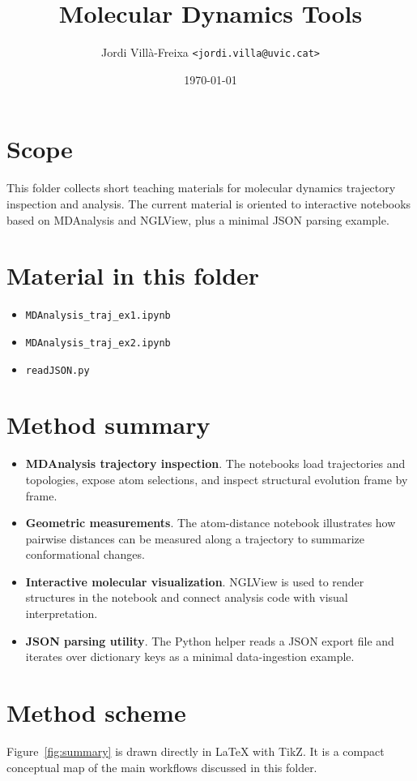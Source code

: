 \documentclass[11pt,a4paper]{article}
\title{Molecular Dynamics Tools}
\author{Jordi Vill\`a-Freixa \texttt{<jordi.villa@uvic.cat>}}
\date{\today}
\begin{document}
    \maketitle

    \section*{Scope}
    This folder collects short teaching materials for molecular dynamics trajectory inspection and analysis. The current material is oriented to interactive notebooks based on MDAnalysis and NGLView, plus a minimal JSON parsing example.

    \section*{Material in this folder}
    \begin{itemize}[leftmargin=*]
\item \texttt{MDAnalysis\_traj\_ex1.ipynb}
\item \texttt{MDAnalysis\_traj\_ex2.ipynb}
\item \texttt{readJSON.py}
    \end{itemize}

    \section*{Method summary}
    \begin{itemize}[leftmargin=*]
\item \textbf{MDAnalysis trajectory inspection}. The notebooks load trajectories and topologies, expose atom selections, and inspect structural evolution frame by frame.
\item \textbf{Geometric measurements}. The atom-distance notebook illustrates how pairwise distances can be measured along a trajectory to summarize conformational changes.
\item \textbf{Interactive molecular visualization}. NGLView is used to render structures in the notebook and connect analysis code with visual interpretation.
\item \textbf{JSON parsing utility}. The Python helper reads a JSON export file and iterates over dictionary keys as a minimal data-ingestion example.
    \end{itemize}

    \section*{Method scheme}
    Figure~\ref{fig:summary} is drawn directly in LaTeX with TikZ. It is a compact conceptual map of the main workflows discussed in this folder.
\end{document}
